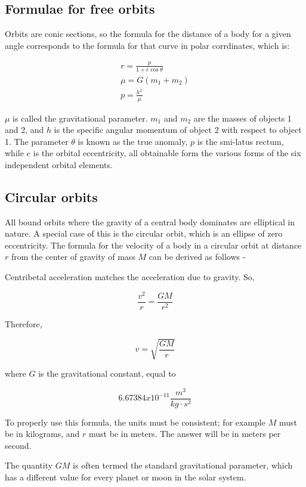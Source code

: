\documentclass{article}
\begin{document}
\subsection{Formulae for free orbits}
Orbits are conic sections, so the formula for the distance of a body for a given angle corresponds to the formula for that curve in polar corrdinates, which is:

\begin{align*}
  r = \frac{p}{1+e\cos\theta} \\
  \mu = G(m_1+m_2) \\
  p=\frac{h^2}{\mu}
\end{align*}

\(\mu\) is called the gravitational parameter. \(m_1\) and \(m_2\) are the masses of objects 1 and 2, and \(h\) is the specific angular momentum of object 2 with respect to object 1. The parameter \(\theta\) is known as the true anomaly, \(p\) is the smi-latus rectum, while \(e\) is the orbital eccentricity, all obtainable form the various forms of the six independent orbital elements.

\subsection{Circular orbits}

All bound orbits where the gravity of a central body dominates are elliptical in nature. A special case of this is the circular orbit, which is an ellipse of zero eccentricity. The formula for the velocity of a body in a circular orbit at distance \(r\) from the center of gravity of mass \(M\) can be derived as follows -

Centribetal acceleration matches the acceleration due to gravity. So,

\[\frac{v^{2}}{r}=\frac{GM}{r^{2}}\]

Therefore,

\[v=\sqrt{\frac{GM}{r}}\]

where \(G\) is the gravitational constant, equal to 

\[6.67384x10^{-11}\frac{m^{3}}{kg\cdot s^2}\]

To properly use this formula, the units must be consistent; for example \(M\) must be in kilograms, and \(r\) must be in meters. The answer will be in meters per second.

The quantity \(GM\) is often termed the standard gravitational parameter, which has a different value for every planet or moon in the solar system.
\end{document}
